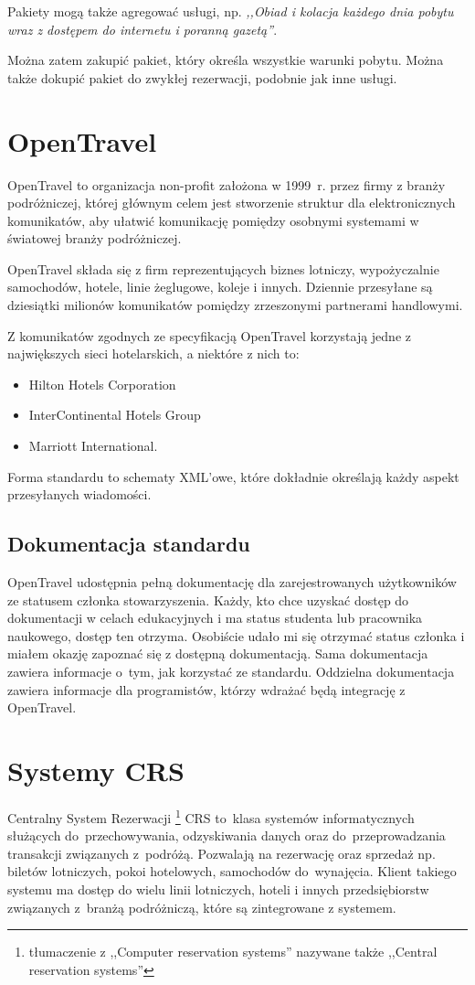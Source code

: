 \documentclass[a4paper,onecolumn,oneside,11pt,wide,floatssmall]{mwrep}
\theoremstyle{definition}
\theoremstyle{plain}%
\theoremstyle{remark}
\begin{document}
Pakiety mogą także agregować usługi, np. \textit{,,Obiad i kolacja każdego dnia 
pobytu wraz z dostępem do internetu i poranną gazetą''}. 

Można zatem zakupić pakiet, który określa wszystkie warunki pobytu. Można 
także dokupić pakiet do zwykłej rezerwacji, podobnie jak inne usługi.

\section{OpenTravel}
OpenTravel to organizacja non-profit założona w \mbox{1999 r.} przez firmy z 
branży podróżniczej, której głównym celem jest stworzenie struktur dla 
elektronicznych komunikatów, aby ułatwić komunikację pomiędzy osobnymi 
systemami w światowej branży podróżniczej.

OpenTravel składa się z firm reprezentujących biznes lotniczy, wypożyczalnie 
samochodów, hotele, linie żeglugowe, koleje i innych. Dziennie przesyłane są 
dziesiątki milionów komunikatów pomiędzy zrzeszonymi partnerami handlowymi.

Z komunikatów zgodnych ze specyfikacją OpenTravel korzystają jedne z największych sieci hotelarskich, a niektóre z nich to:
\begin{itemize}
  \item Hilton Hotels Corporation
  \item InterContinental Hotels Group
  \item Marriott International.
\end{itemize}

Forma standardu to schematy XML'owe, które dokładnie określają każdy aspekt 
przesyłanych wiadomości.

\subsection{Dokumentacja standardu}
OpenTravel udostępnia pełną dokumentację dla zarejestrowanych użytkowników 
ze statusem członka stowarzyszenia. Każdy, kto chce uzyskać dostęp do 
dokumentacji w celach edukacyjnych i ma status studenta lub pracownika 
naukowego, dostęp ten otrzyma. Osobiście udało mi się otrzymać status członka 
i miałem okazję zapoznać się z dostępną dokumentacją.
Sama dokumentacja zawiera informacje \mbox{o tym}, jak korzystać ze standardu. 
Oddzielna dokumentacja zawiera informacje dla programistów, którzy wdrażać będą 
integrację z OpenTravel.

\section{Systemy CRS}
\label{system-crs}
Centralny System Rezerwacji \footnote{tłumaczenie z ,,Computer reservation 
systems'' nazywane także ,,Central reservation systems''} CRS \mbox{to klasa} systemów 
informatycznych służących \mbox{do przechowywania}, odzyskiwania danych oraz \mbox{do 
przeprowadzania} transakcji związanych \mbox{z podróżą}. Pozwalają na rezerwację 
oraz sprzedaż np. biletów lotniczych, pokoi hotelowych, samochodów \mbox{do 
wynajęcia}. Klient takiego systemu ma dostęp do wielu linii lotniczych, 
hoteli i innych przedsiębiorstw związanych \mbox{z branżą} podróżniczą, które są 
zintegrowane z systemem.
\end{document}
